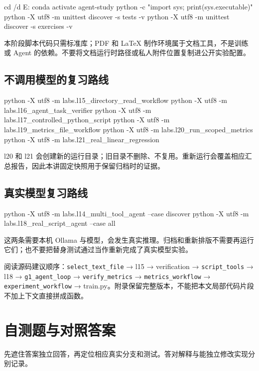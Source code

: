 \documentclass[UTF8,zihao=-4,fontset=fandol]{ctexart}
\begin{document}
\begin{Code}
cd /d E:\study\agent
conda activate agent-study
python -c "import sys; print(sys.executable)"
python -X utf8 -m unittest discover -s tests -v
python -X utf8 -m unittest discover -s exercises -v
\end{Code}

本阶段脚本代码只需标准库；PDF 和 LaTeX 制作环境属于文档工具，不是训练或 Agent 的依赖。不要将文档运行时路径或私人附件位置复制进公开实验配置。

\subsection{不调用模型的复习路线}

\begin{Code}
python -X utf8 -m labs.l15_directory_read_workflow
python -X utf8 -m labs.l16_agent_task_verifier
python -X utf8 -m labs.l17_controlled_python_script
python -X utf8 -m labs.l19_metrics_file_workflow
python -X utf8 -m labs.l20_run_scoped_metrics
python -X utf8 -m labs.l21_real_linear_regression
\end{Code}

l20 和 l21 会创建新的运行目录；旧目录不删除、不复用。重新运行会覆盖相应汇总报告，因此本讲固定快照用于保留归档时的证据。

\subsection{真实模型复习路线}

\begin{Code}
python -X utf8 -m labs.l14_multi_tool_agent --case discover
python -X utf8 -m labs.l18_real_script_agent --case all
\end{Code}

这两条需要本机 Ollama 与模型，会发生真实推理。归档和重新排版不需要再运行它们；也不要把替身测试通过当作重新完成了真实模型实验。

阅读源码建议顺序：\nolinkurl{select_text_file} → l15 → verification → \nolinkurl{script_tools} → l18 → \nolinkurl{g1_agent_loop} → \nolinkurl{verify_metrics} → \nolinkurl{metrics_workflow} → \nolinkurl{experiment_workflow} → train.py。附录保留完整版本，不能把本文局部代码片段不加上下文直接拼成函数。

\section{自测题与对照答案}

先遮住答案独立回答，再定位相应真实分支和测试。答对解释与能独立修改实现分别记录。
\end{document}
